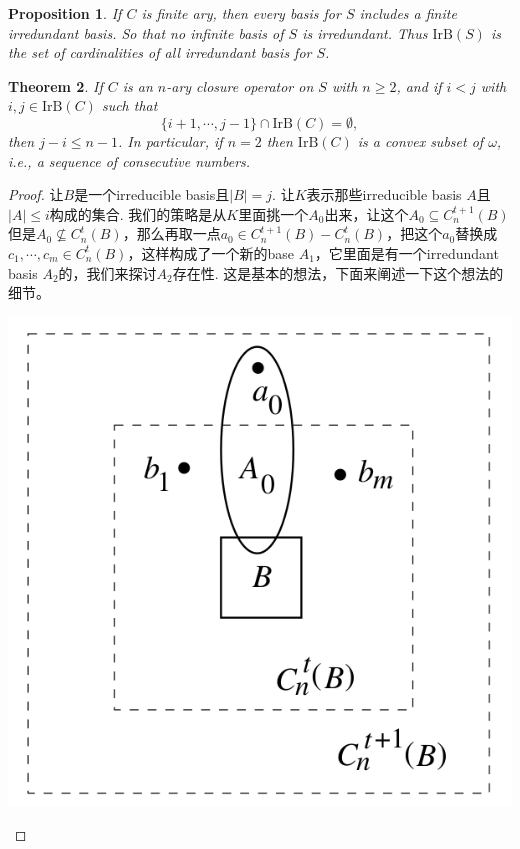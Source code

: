 \documentclass{article}
\newtheorem{theorem}{Theorem}[section]
\newtheorem{proposition}[theorem]{Proposition}
\begin{document}
\begin{proposition}
\rm If $C$ is finite ary, then every basis for $S$ includes a finite irredundant basis. So that no infinite basis of $S$ is irredundant. Thus $\text{IrB}(S)$ is the set of cardinalities of all irredundant basis for $S$.
\end{proposition}


\begin{theorem}
\rm If $C$ is an $n$-ary closure operator on $S$ with $n \geq 2$, and if $i < j$ with $i, j \in \text{IrB}(C)$ such that 
$$
\{i+1,\cdots,j-1\} \cap \text{IrB}(C) = \emptyset,
$$
then $j-i \leq n-1$. In particular, if $n=2$ then $\text{IrB}(C)$ is a convex subset of $\omega$, i.e., a sequence of consecutive numbers. 
\end{theorem}

\begin{proof}
让$B$是一个irreducible basis且$|B| = j$. 让$K$表示那些irreducible basis $A$且$|A| \leq i$构成的集合. 我们的策略是从$K$里面挑一个$A_0$出来，让这个$A_0 \subseteq C_n^{t+1}(B)$但是$A_0 \nsubseteq C_n^{t}(B)$，那么再取一点$a_0 \in C_n^{t+1}(B) - C_n^{t}(B)$，把这个$a_0$替换成$c_1,\cdots,c_m \in C_n^{t}(B)$，这样构成了一个新的base $A_1$，它里面是有一个irredundant basis $A_2$的，我们来探讨$A_2$存在性. 这是基本的想法，下面来阐述一下这个想法的细节。

\begin{center}
\includegraphics[scale=0.5]{./images/irredundant.png}
\end{center}



\end{proof}
\end{document}

